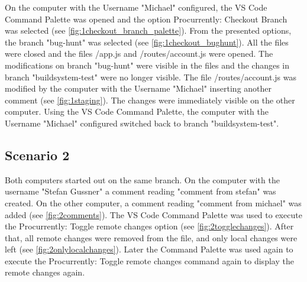 On the computer with the Username "Michael" configured, the VS Code Command Palette was opened and the option Procurrently: Checkout Branch was selected (see \autoref{fig:1checkout_branch_palette}). From the presented options, the branch "bug-hunt" was selected (see \autoref{fig:1checkout_bughunt}). All the files were closed and the files /app.js and /routes/account.js were opened. The modifications on branch "bug-hunt" were visible in the files and the changes in branch "buildsystem-test" were no longer visible. The file /routes/account.js was modified by the computer with the Username "Michael" inserting another comment (see \autoref{fig:1staging}). The changes were immediately visible on the other computer. Using the VS Code Command Palette, the computer with the Username "Michael" configured switched back to branch "buildsystem-test".

\subsection{Scenario 2}

Both computers started out on the same branch. On the computer with the username "Stefan Gussner" a comment reading "comment from stefan" was created. On the other computer, a comment reading "comment from michael" was added (see \autoref{fig:2comments}). The VS Code Command Palette was used to execute the Procurrently: Toggle remote changes option (see \autoref{fig:2togglechanges}). After that, all remote changes were removed from the file, and only local changes were left (see \autoref{fig:2onlylocalchanges}). Later the Command Palette was used again to execute the Procurrently: Toggle remote changes command again to display the remote changes again.


